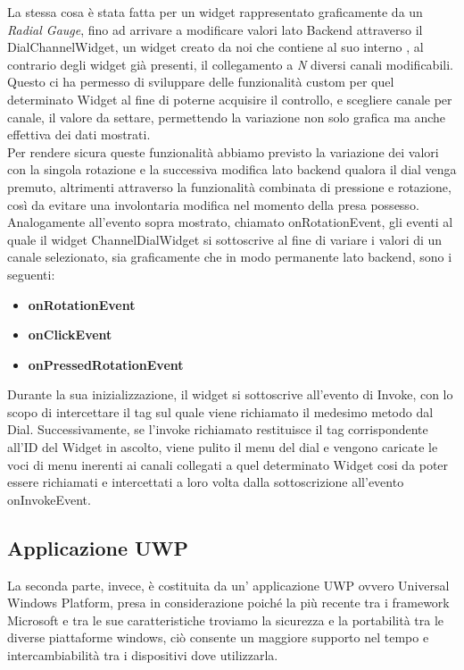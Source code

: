 La stessa cosa è stata fatta per un widget rappresentato graficamente da un \emph{Radial Gauge}, fino ad arrivare a modificare valori lato Backend attraverso il DialChannelWidget, un widget creato da noi che contiene al suo interno , al contrario degli widget già presenti, il collegamento a \emph{N} diversi canali modificabili.
Questo ci ha permesso di sviluppare delle funzionalità custom per quel determinato Widget al fine di poterne acquisire il controllo, e scegliere canale per canale, il valore da settare, permettendo la variazione non solo grafica ma anche effettiva dei dati mostrati.\\

Per rendere sicura queste funzionalità abbiamo previsto la variazione dei valori con la singola rotazione e la successiva modifica lato backend qualora il dial venga premuto, altrimenti attraverso la funzionalità combinata di pressione e rotazione, così da evitare una involontaria modifica nel momento della presa possesso.\\

Analogamente all'evento sopra mostrato, chiamato onRotationEvent, gli eventi al quale il widget ChannelDialWidget si sottoscrive al fine di variare i valori di un canale selezionato, sia graficamente che in modo permanente lato backend, sono i seguenti:

\begin{itemize}
\item \textbf{onRotationEvent} 
\item \textbf{onClickEvent} 
\item \textbf{onPressedRotationEvent}
\end{itemize}

Durante la sua inizializzazione, il widget si sottoscrive all'evento di Invoke, con lo scopo di intercettare il tag sul quale viene richiamato il medesimo metodo dal Dial. Successivamente, se l'invoke richiamato restituisce il tag corrispondente all'ID del Widget in ascolto, viene pulito il menu del dial e vengono caricate le voci di menu inerenti ai canali collegati a quel determinato Widget cosi da poter essere richiamati e intercettati a loro volta dalla sottoscrizione all'evento onInvokeEvent.
 
\subsection{Applicazione UWP}

La seconda parte, invece, è costituita da un’ applicazione UWP ovvero Universal Windows Platform, presa in considerazione poiché la più recente tra i framework Microsoft e tra le sue caratteristiche troviamo la sicurezza e la portabilità tra le diverse piattaforme windows, ciò consente un maggiore supporto nel tempo e intercambiabilità tra i dispositivi dove utilizzarla.\\


